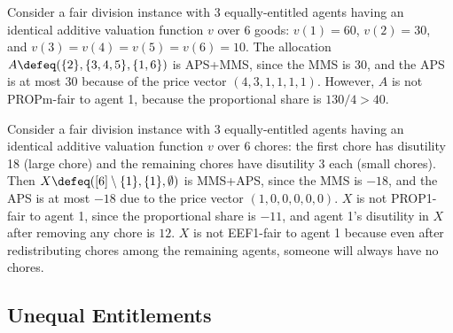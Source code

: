 \begin{example}
\label{cex:aps-not-propm}
Consider a fair division instance with 3 equally-entitled agents
having an identical additive valuation function $v$ over 6 goods:
$v(1) = 60$, $v(2) = 30$, and $v(3) = v(4) = v(5) = v(6) = 10$.
The allocation $A \defeq (\{2\}, \{3, 4, 5\}, \{1, 6\})$ is APS+MMS, since the MMS is 30,
and the APS is at most 30 because of the price vector $(4, 3, 1, 1, 1, 1)$.
However, $A$ is not PROPm-fair to agent 1, because the proportional share is $130/4 > 40$.
\end{example}

\begin{example}
\label{cex:aps-not-prop1-chores}
Consider a fair division instance with 3 equally-entitled agents
having an identical additive valuation function $v$ over 6 chores:
the first chore has disutility 18 (large chore) and the remaining chores have disutility 3 each (small chores).
Then $X \defeq ([6] \setminus \{1\}, \{1\}, \emptyset)$ is MMS+APS,
since the MMS is $-18$, and the APS is at most $-18$ due to the price vector $(1, 0, 0, 0, 0, 0)$.
$X$ is not PROP1-fair to agent 1, since the proportional share is $-11$,
and agent 1's disutility in $X$ after removing any chore is $12$.
$X$ is not EEF1-fair to agent 1 because even after redistributing chores among the remaining agents,
someone will always have no chores.
\end{example}

\subsection{Unequal Entitlements}
\label{sec:cex-extra:uneqEnt}

